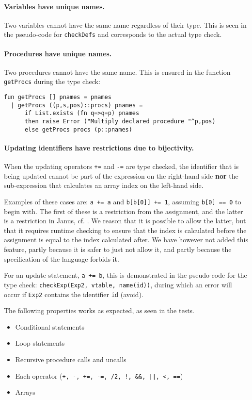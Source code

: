 \paragraph{Variables have unique names.} Two variables cannot have the same name
regardless of their type. This is seen in the pseudo-code for \verb+checkDefs+
and corresponds to the actual type check.

\paragraph{Procedures have unique names.} Two procedures cannot have the same
name. This is ensured in the function \verb+getProcs+ during the type check:

\begin{verbatim}
fun getProcs [] pnames = pnames
  | getProcs ((p,s,pos)::procs) pnames =
      if List.exists (fn q=>q=p) pnames
      then raise Error ("Multiply declared procedure "^p,pos)
      else getProcs procs (p::pnames)
\end{verbatim}

\paragraph{Updating identifiers have restrictions due to bijectivity.} When the
updating operators \verb!+=! and \verb!-=! are type checked, the identifier that
is being updated cannot be part of the expression on the right-hand side {\bf
nor} the sub-expression that calculates an array index on the left-hand side.

Examples of these cases are: \verb!a += a! and \verb!b[b[0]] += 1!, assuming
\verb!b[0] == 0! to begin with. The first of these is a restriction from the
assignment, and the latter is a restriction in Janus, cf. \cite[ch.
2.1]{yokoyama}. We reason that it is possible to allow the latter, but that it
requires runtime checking to ensure that the index is calculated before the
assignment is equal to the index calculated after. We have however not added
this feature, partly because it is safer to just not allow it, and partly
because the specification of the language forbids it.

For an update statement, \verb!a += b!, this is demonstrated in the pseudo-code
for the type check: \verb+checkExp(Exp2, vtable, name(id))+, during which an
error will occur if \verb+Exp2+ contains the identifier \verb+id+ (avoid).

\vspace{0.2cm}
The following properties works as expected, as seen in the tests.
\begin{itemize}
\item Conditional statements
\item Loop statements
\item Recursive procedure calls and uncalls
\item Each operator ({\tt +, -, +=, -=, /2, !, \&\&, ||,  <, ==})
\item Arrays
\end{itemize}
